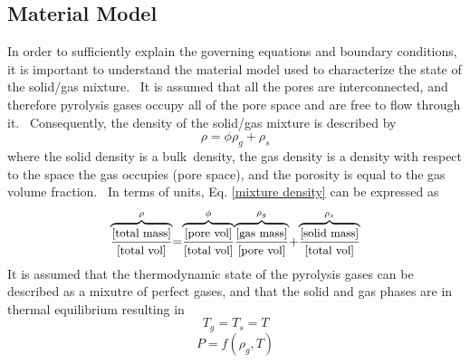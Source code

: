 \subsection{Material Model}
In order to sufficiently explain the governing equations and boundary
conditions, it is important to understand the material model used to
characterize the state of the solid/gas mixture. \ It is assumed that all
the pores are interconnected, and therefore pyrolysis gases occupy all of
the pore space and are free to flow through it. \ Consequently, the density
of the solid/gas mixture is described by%
\begin{equation}
\rho =\phi \rho _{g}+\rho _{s}  
\label{mixture density}
\end{equation}%
where the solid density is a bulk\ density, the gas density is a
density with respect to the space the gas occupies (pore space), and the porosity is equal to the gas volume fraction. \ In terms of
units, Eq. \ref{mixture density} can be expressed as 
\begin{equation}
\overset{{\Huge \rho }}{\overbrace{\frac{\text{{\small [total mass]}}}{%
\text{{\small [total vol]}}}}}{\small =}\overset{{\Huge \phi }}{\overbrace{%
\frac{\text{{\small [pore vol]}}}{\text{{\small [total vol]}}}}}\overset{%
{\Huge \rho }_{g}}{\overbrace{\frac{\text{{\small [gas mass]}}}{\text{%
{\small [pore vol]}}}}}{\small +}\overset{{\Huge \rho }_{s}}{\overbrace{%
\frac{\text{{\small [solid mass]}}}{\text{{\small [total vol]}}}}}
\end{equation}
It is assumed that the thermodynamic state of the pyrolysis gases can be
described as a mixutre of perfect gases, and that the solid and gas phases are in
thermal equilibrium resulting in 
\begin{equation}
T_{g}=T_{s}=T
\end{equation}
\begin{equation}
P= f\left(\rho _{g},T\right)
\end{equation}%

